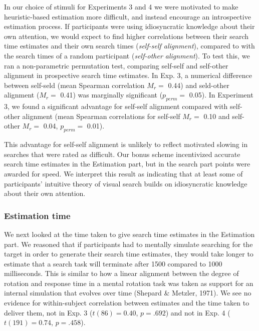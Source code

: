 \documentclass[12pt,twoside]{reedthesis}
\begin{document}
In our choice of stimuli for Experiments 3 and 4 we were motivated to make heuristic-based estimation more difficult, and instead encourage an introspective estimation process. If participants were using idiosyncratic knowledge about their own attention, we would expect to find higher correlations between their search time estimates and their own search times (\emph{self-self alignment}), compared to with the search times of a random participant (\emph{self-other alignment}). To test this, we ran a non-parametric permutation test, comparing self-self and self-other alignment in prospective search time estimates. In Exp. 3, a numerical difference between self-seld (mean Spearman correlation \(M_r=\) 0.44) and seld-other alignment (\(M_r=\) 0.41) was marginally significant (\(p_{perm}=\) 0.05). In Experiment 3, we found a significant advantage for self-self alignment compared with self-other alignment (mean Spearman correlations for self-self \(M_r=\) 0.10 and self-other \(M_r=\) 0.04, \(p_{perm}=\) 0.01).

This advantage for self-self alignment is unlikely to reflect motivated slowing in searches that were rated as difficult. Our bonus scheme incentivized accurate search time estimates in the Estimation part, but in the search part points were awarded for speed. We interpret this result as indicating that at least some of participants' intuitive theory of visual search builds on idiosyncratic knowledge about their own attention.

\hypertarget{estimation-time}{%
\subsubsection*{Estimation time}\label{estimation-time}}

We next looked at the time taken to give search time estimates in the Estimation part. We reasoned that if participants had to mentally simulate searching for the target in order to generate their search time estimates, they would take longer to estimate that a search task will terminate after 1500 compared to 1000 milliseconds. This is similar to how a linear alignment between the degree of rotation and response time in a mental rotation task was taken as support for an internal simulation that evolves over time (Shepard \& Metzler, 1971). We see no evidence for within-subject correlation between estimates and the time taken to deliver them, not in Exp. 3 (\(t(86) = 0.40\), \(p = .692\)) and not in Exp. 4 (\(t(191) = 0.74\), \(p = .458\)).
\end{document}
